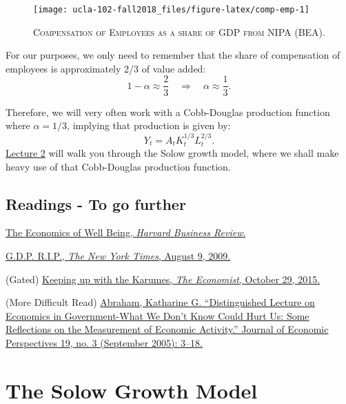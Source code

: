 \documentclass[]{book}
\theoremstyle{definition}
\theoremstyle{definition}
\theoremstyle{definition}
\theoremstyle{remark}
\begin{document}
\begin{figure}

{\centering \texttt{[image: ucla-102-fall2018\_files/figure-latex/comp-emp-1]} 

}

\caption{\textsc{Compensation of Employees as a share of GDP
from NIPA (BEA)}.}\label{fig:comp-emp}
\end{figure}

For our purposes, we only need to remember that the share of
compensation of employees is approximately 2/3 of value added:
\[1-\alpha \approx \frac{2}{3} \quad \Rightarrow \quad \boxed{\alpha \approx \frac{1}{3}}.\]

Therefore, we will very often work with a Cobb-Douglas production
function where \(\alpha=1/3\), implying that production is given by:
\[Y_t = A_t K_t^{1/3} L_t^{2/3}.\]
\protect\hyperlink{lecture-solow}{Lecture 2} will walk you through the
Solow growth model, where we shall make heavy use of that Cobb-Douglas
production function.

\section*{Readings - To go further}\label{readings---to-go-further}

\href{https://hbr.org/2012/01/the-economics-of-well-being}{The Economics
of Well Being, \emph{Harvard Business Review}.}

\href{https://search.proquest.com/hnpnewyorktimes/docview/1030670685/A9EF0C9A254D4699PQ/1?accountid=14512}{G.D.P.
R.I.P., \emph{The New York Times}, August 9, 2009.}

(Gated)
\href{https://www.economist.com/news/finance-and-economics/21677223-new-study-shows-money-can-buy-you-happinessbut-only-fleetingly-others}{Keeping
up with the Karumes, \emph{The Economist}, October 29, 2015.}

(More Difficult Read)
\href{https://doi.org/10.1257/089533005774357833}{Abraham, Katharine G.
``Distinguished Lecture on Economics in Government-What We Don't Know
Could Hurt Us: Some Reflections on the Measurement of Economic
Activity.'' Journal of Economic Perspectives 19, no. 3 (September 2005):
3--18.}

\hypertarget{solow}{\chapter{The Solow Growth Model}\label{solow}}
\end{document}
